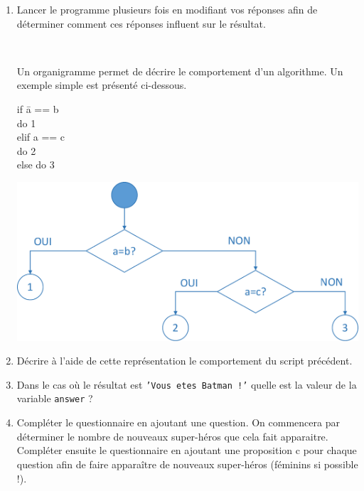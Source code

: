 \begin{exercice}

\begin{enumerate}
\item Lancer le programme plusieurs fois en modifiant vos réponses afin de déterminer comment ces réponses influent sur le résultat.

~\

Un organigramme permet de décrire le comportement d'un algorithme. Un exemple simple est présenté ci-dessous.

\begin{minipage}{.2\linewidth}
\ttfamily

\begin{tabbing}
if \= a == b \\
\> do 1 \\
elif a == c \\
\> do 2 \\
else do 3
\end{tabbing}

\rmfamily

\end{minipage}\hfill
\begin{minipage}{.7\linewidth}
\includegraphics[width=0.6\linewidth]{img/Organigramme}
\end{minipage}
\item Décrire à l'aide de cette représentation le comportement du script précédent.
\item Dans le cas où le résultat est \texttt{'Vous etes Batman !'} quelle est la valeur de la variable \texttt{answer} ?
\item Compléter le questionnaire en ajoutant une question. On commencera par déterminer le nombre de nouveaux super-héros que cela fait apparaitre. \\
Compléter ensuite le questionnaire en ajoutant une proposition \og c \fg pour chaque question afin de faire apparaître de nouveaux super-héros (féminins si possible !).
\end{enumerate}
\end{exercice}



